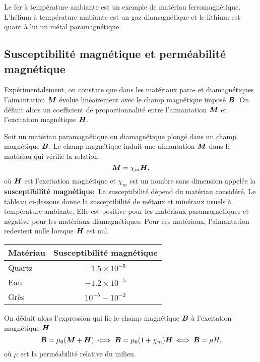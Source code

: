 \begin{exemple}
	Le fer à température ambiante est un exemple de matériau ferromagnétique.
	L'hélium à température ambiante est un gaz diamagnétique et le lithium est
	quant à lui un métal paramagnétique.
\end{exemple}

\subsection{Susceptibilité magnétique et perméabilité magnétique}
Expérimentalement, on constate que dans les matériaux para- et diamagnétiques
l'aimantation $\vecM$ évolue linéairement avec le champ magnétique imposé
$\vecb$. On définit alors un coefficient de proportionnalité entre l'aimantation
$\vecM$ et l'excitation magnétique $\vecH$.

\begin{defn}
	Soit un matériau paramagnétique ou diamagnétique plongé dans un champ magnétique
	$\vecb$. Le champ magnétique induit une aimantation $\vecM$ dans le matériau
	qui vérifie la relation
	\begin{equation}
		\vecM = \chi_m \vecH,
	\end{equation}
	où $\vecH$ est l'excitation magnétique et $\chi_m$ est un nombre sans
	dimension appelée la \textbf{susceptibilité magnétique}. La susceptibilité
	dépend du matériau considéré. Le tableau ci-dessous
	donne la susceptibilité de métaux et minéraux usuels à température ambiante. 
	Elle est positive pour les matériaux paramagnétiques et négative
	pour les matériaux diamagnétiques. Pour ces matériaux, l'aimantation
	redevient nulle lorsque $\vecH$ est nul.

	\begin{center}
	\begin{tabular}{l|c}
		\textbf{Matériau} & \textbf{Susceptibilité magnétique}  \\\hline
		Quartz 	 & $-1.5 \times 10^{-5}$ \\[0.5em]
		Eau 	 & $-1.2 \times 10^{-5}$ \\[0.5em]
		Grès     & $10^{-5} - 10^{-2}$\\[0.5em]
	\end{tabular}
	\end{center}

	On déduit alors l'expression qui lie le champ magnétique $\vecb$ à
	l'excitation magnétique $\vecH$
	\begin{equation}
		\vecb = \mu_0(\vecM + \vecH) \iff \vecb = \mu_0 (1 + \chi_m)
		\vecH \iff \vecb = \mu H,
	\end{equation}
	où $\mu$ est la perméabilité relative du milieu.
\end{defn}

